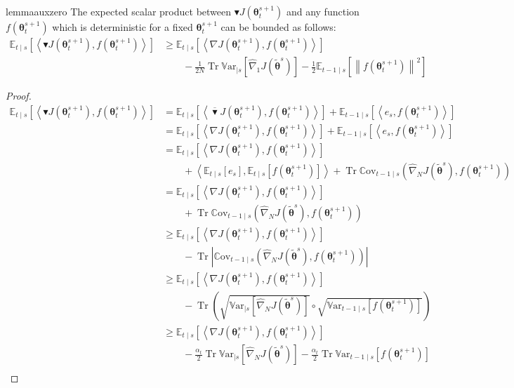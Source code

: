 \documentclass{article}
\theoremstyle{remark}
\theoremstyle{definition}
\DeclareMathOperator{\Tr}{Tr}
\newcommand{\norm}[2][\infty]{\left\|#2\right\|_{#1}}
\newcommand{\dotprod}[2]{\left\langle#1,#2\right\rangle}
\newcommand{\vtheta}{\boldsymbol{\theta}}
\newcommand{\gradJ}[1]{\nabla J(#1)}
\newcommand{\gradApp}[2]{\hat{\nabla}_{#2}J(#1)}
\newcommand{\Ets}[2][t]{\mathbb{E}_{#1\mid s}\left[#2\right]}
\newcommand{\Covts}[3][t]{{\mathbb{C}\text{ov}}_{#1\mid s}\left(#2,#3\right)}
\newcommand{\Varts}[2][t]{{\mathbb{V}\text{ar}}_{#1\mid s}\left[#2\right]}
\newcommand{\gradBlack}[1]{\blacktriangledown J(#1)}
\newcommand{\gradIdeal}[1]{\overline{\blacktriangledown} J(#1)}
\begin{document}
\begin{restatable}[]{lemma}{auxzero}\label{lemma:aux0}
The expected scalar product between $\gradBlack{\vtheta_t^{s+1}}$ and any function $f(\vtheta_t^{s+1})$ which is deterministic for a fixed $\vtheta_t^{s+1}$ can be bounded as follows:
\begin{align*}
\Ets[t]{\dotprod{\gradBlack{\vtheta_t^{s+1}}}{f(\vtheta_t^{s+1})}} &\geq
\Ets{\dotprod{\gradJ{\vtheta_t^{s+1}}}{f(\vtheta_t^{s+1})}} \\
&\qquad-
\frac{1}{2N}\Tr\Varts[]{\gradApp{\tilde{\vtheta}^s}{1}} -\frac{1}{2}\Ets[t-1]{\norm[]{f(\vtheta_t^{s+1})}^2}
\end{align*}
\end{restatable}
\begin{proof}
\begin{align}
	\Ets{\dotprod{\gradBlack{\vtheta_t^{s+1}}}{f(\vtheta_t^{s+1})}}
	&=
	\Ets{\dotprod{\gradIdeal{\vtheta_t^{s+1}}}{f(\vtheta_t^{s+1})}} +
	\Ets[t-1]{\dotprod{e_s}{f(\vtheta_t^{s+1})}} \\
	&=
	\Ets{\dotprod{\gradJ{\vtheta_t^{s+1}}}{f(\vtheta_t^{s+1})}} +
	\Ets[t-1]{\dotprod{e_s}{f(\vtheta_t^{s+1})}} \\
	&=
	\Ets{\dotprod{\gradJ{\vtheta_t^{s+1}}}{f(\vtheta_t^{s+1})}} \nonumber\\
	&\qquad+
	\dotprod{\Ets{e_s}}{\Ets{f(\vtheta_t^{s+1})}}
	+\Tr\Covts[t-1]{\gradApp{\tilde{\vtheta}^s}{N}}{f(\vtheta_t^{s+1})}  \nonumber\\
	&= 
	\Ets{\dotprod{\gradJ{\vtheta_t^{s+1}}}{f(\vtheta_t^{s+1})}} \nonumber\\
	&\qquad+
	\Tr\Covts[t-1]{\gradApp{\tilde{\vtheta}^s}{N}}{f(\vtheta_t^{s+1})} \\
	&\geq  
	\Ets{\dotprod{\gradJ{\vtheta_t^{s+1}}}{f(\vtheta_t^{s+1})}} \nonumber\\
	&\qquad-
	\Tr\left|\Covts[t-1]{\gradApp{\tilde{\vtheta}^s}{N}}{f(\vtheta_t^{s+1})}\right| \nonumber \\
	&\geq
	\Ets{\dotprod{\gradJ{\vtheta_t^{s+1}}}{f(\vtheta_t^{s+1})}} \nonumber\\
	&\qquad-\Tr\left(\sqrt{\Varts[]{\gradApp{\tilde{\vtheta}^s}{N}}}\circ\sqrt{\Varts[t-1]{f(\vtheta_t^{s+1})}}\right) \nonumber\\
	&\geq	
	\Ets{\dotprod{\gradJ{\vtheta_t^{s+1}}}{f(\vtheta_t^{s+1})}} \nonumber\\
	&\qquad-
	\frac{\alpha_t}{2}\Tr\Varts[]{\gradApp{\tilde{\vtheta}^s}{N}} -\frac{\alpha_t}{2}\Tr\Varts[t-1]{f(\vtheta_t^{s+1})}\\

\end{align}
\end{proof}
\end{document}
